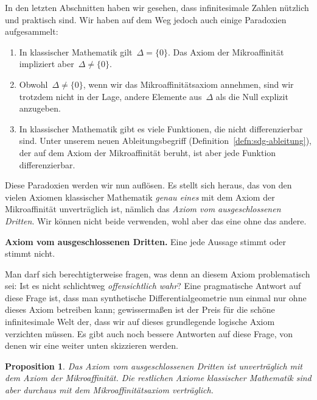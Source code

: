 \documentclass[twoside]{../zirkelblatt}
\theoremstyle{definition}
\theoremstyle{plain}
\newtheorem{prop}[defn]{Proposition}
\theoremstyle{remark}
\begin{document}
In den letzten Abschnitten haben wir gesehen, dass infinitesimale Zahlen
nützlich und praktisch sind. Wir haben auf dem Weg jedoch auch einige
Paradoxien aufgesammelt:
\begin{enumerate}
\item[1.] In klassischer Mathematik gilt~$\Delta = \{0\}$. Das Axiom der
Mikroaffinität impliziert aber~$\Delta \neq \{0\}$.
\item[2.] Obwohl~$\Delta \neq \{0\}$, wenn wir das Mikroaffinitätsaxiom annehmen,
sind wir trotzdem nicht in der Lage, andere Elemente aus~$\Delta$ als die Null
explizit anzugeben.
\item[3.] In klassischer Mathematik gibt es viele Funktionen, die nicht
differenzierbar sind. Unter unserem neuen Ableitungsbegriff
(Definition~\ref{defn:sdg-ableitung}), der auf dem Axiom
der Mikroaffinität beruht, ist aber jede Funktion differenzierbar.
\end{enumerate}
Diese Paradoxien werden wir nun auflösen. Es stellt sich heraus, das von den
vielen Axiomen klassischer Mathematik \emph{genau eines} mit dem Axiom der
Mikroaffinität unverträglich ist, nämlich das \emph{Axiom vom ausgeschlossenen
Dritten}. Wir können nicht beide verwenden, wohl aber das eine ohne das andere.

\begin{shaded}
\textbf{Axiom vom ausgeschlossenen Dritten.} Eine jede Aussage stimmt oder
stimmt nicht.
\end{shaded}

Man darf sich berechtigterweise fragen, was denn an diesem Axiom problematisch
sei: Ist es nicht schlichtweg \emph{offensichtlich wahr}? Eine pragmatische
Antwort auf diese Frage ist, dass man synthetische Differentialgeometrie nun einmal
nur ohne dieses Axiom betreiben kann; gewissermaßen ist der Preis für die
schöne infinitesimale Welt der, dass wir auf dieses grundlegende logische Axiom
verzichten müssen. Es gibt auch noch bessere Antworten auf diese Frage, von
denen wir eine weiter unten skizzieren werden.


\begin{prop}Das Axiom vom ausgeschlossenen Dritten ist unverträglich mit dem
Axiom der Mikroaffinität. Die restlichen Axiome klassischer Mathematik
sind aber durchaus mit dem Mikroaffinitätsaxiom verträglich.\end{prop}
\end{document}
